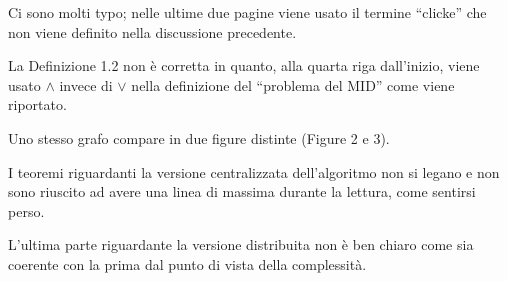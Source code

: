 \documentclass[11pt]{article}
\begin{document}
\theform
\begin{formalreport}
  Ci sono molti typo; nelle ultime due pagine viene usato il termine
  ``clicke'' che non viene definito nella discussione precedente. 

  La Definizione 1.2 non \`e corretta in quanto, alla quarta riga
  dall'inizio, viene usato $\wedge$ invece di $\vee$ nella definizione
  del ``problema del MID'' come viene riportato. 

  Uno stesso grafo compare in due figure distinte (Figure 2 e 3).

  I teoremi riguardanti la versione centralizzata dell'algoritmo non
  si legano e non sono riuscito ad avere una linea di massima durante
  la lettura, come sentirsi perso.

  L'ultima parte riguardante la versione distribuita non \`e ben
  chiaro come sia coerente con la prima dal punto di vista della
  complessit\`a.
\end{formalreport}
\end{document}
